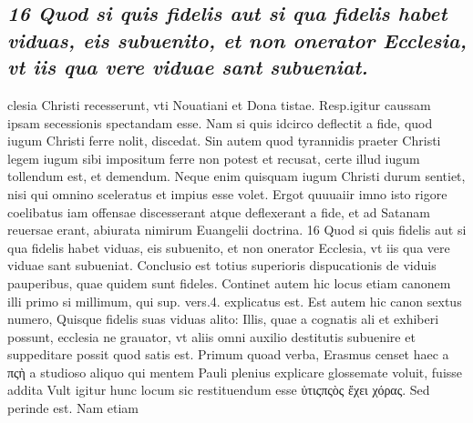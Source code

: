 \documentclass{article}
\begin{document}
\begin{pages}
\subsection*{\textit{16 Quod si quis fidelis aut si qua fidelis habet viduas, eis subuenito, et non onerator Ecclesia, vt iis qua vere viduae sant subueniat.}}clesia Christi recesserunt, vti Nouatiani et Dona tistae. Resp.igitur caussam ipsam secessionis spectandam esse. Nam si quis idcirco deflectit a fide, quod iugum Christi ferre nolit, discedat. Sin autem quod tyrannidis praeter Christi legem iugum sibi impositum ferre non potest et recusat, certe illud iugum tollendum est, et demendum. Neque enim quisquam iugum Christi durum sentiet, nisi qui omnino sceleratus et impius esse volet. Ergot quuuaiir imno isto rigore coelibatus iam offensae discesserant atque deflexerant a fide, et ad Satanam reuersae erant, abiurata nimirum Euangelii doctrina. 16 Quod si quis fidelis aut si qua fidelis habet viduas, eis subuenito, et non onerator Ecclesia, vt iis qua vere viduae sant subueniat. Conclusio est totius superioris dispucationis de viduis pauperibus, quae quidem sunt fideles. Continet autem hic locus etiam canonem illi primo si millimum, qui sup. vers.4. explicatus est. Est autem hic canon sextus numero, Quisque fidelis suas viduas alito: Illis, quae a cognatis ali et exhiberi possunt, ecclesia ne grauator, vt aliis omni auxilio destitutis subuenire et suppeditare possit quod satis est. Primum quoad verba, Erasmus censet haec a πςὴ a studioso aliquo qui mentem Pauli plenius explicare glossemate voluit, fuisse addita Vult igitur hunc locum sic restituendum esse ὐτιςπςὸς ἔχει χόρας. Sed perinde est. Nam etiam  \pend

\end{pages}
\end{document}
